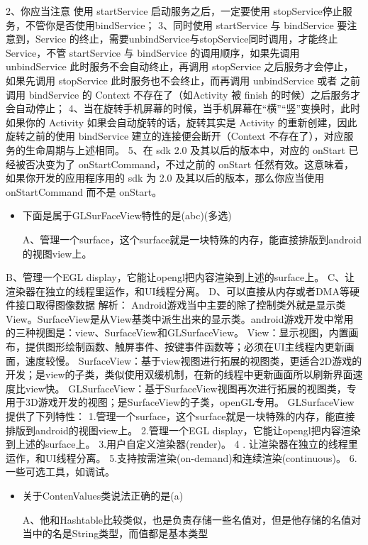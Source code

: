 \documentclass[9pt, b5paper]{article}
\begin{document}
2、你应当注意 使用 startService 启动服务之后，一定要使用 stopService停止服务，不管你是否使用bindService；
3、同时使用 startService 与 bindService 要注意到，Service 的终止，需要unbindService与stopService同时调用，才能终止 Service，不管 startService 与 bindService 的调用顺序，如果先调用 unbindService 此时服务不会自动终止，再调用 stopService 之后服务才会停止，如果先调用 stopService 此时服务也不会终止，而再调用 unbindService 或者 之前调用 bindService 的 Context 不存在了（如Activity 被 finish 的时候）之后服务才会自动停止；
4、当在旋转手机屏幕的时候，当手机屏幕在“横”“竖”变换时，此时如果你的 Activity 如果会自动旋转的话，旋转其实是 Activity 的重新创建，因此旋转之前的使用 bindService 建立的连接便会断开（Context 不存在了），对应服务的生命周期与上述相同。
5、在 sdk 2.0 及其以后的版本中，对应的 onStart 已经被否决变为了 onStartCommand，不过之前的 onStart 任然有效。这意味着，如果你开发的应用程序用的 sdk 为 2.0 及其以后的版本，那么你应当使用 onStartCommand 而不是 onStart。
\begin{itemize}
\item 下面是属于GLSurFaceView特性的是(abc)(多选)

A、管理一个surface，这个surface就是一块特殊的内存，能直接排版到android的视图view上。
\end{itemize}
B、管理一个EGL display，它能让opengl把内容渲染到上述的surface上。
C、让渲染器在独立的线程里运作，和UI线程分离。
D、可以直接从内存或者DMA等硬件接口取得图像数据
    解析：
    Android游戏当中主要的除了控制类外就是显示类View。SurfaceView是从View基类中派生出来的显示类。android游戏开发中常用的三种视图是：view、SurfaceView和GLSurfaceView。
View：显示视图，内置画布，提供图形绘制函数、触屏事件、按键事件函数等；必须在UI主线程内更新画面，速度较慢。
SurfaceView：基于view视图进行拓展的视图类，更适合2D游戏的开发；是view的子类，类似使用双缓机制，在新的线程中更新画面所以刷新界面速度比view快。
GLSurfaceView：基于SurfaceView视图再次进行拓展的视图类，专用于3D游戏开发的视图；是SurfaceView的子类，openGL专用。
 GLSurfaceView提供了下列特性：
                1.管理一个surface，这个surface就是一块特殊的内存，能直接排版到android的视图view上。
                2.管理一个EGL display，它能让opengl把内容渲染到上述的surface上。
                3.用户自定义渲染器(render)。
                4 . 让渲染器在独立的线程里运作，和UI线程分离。
                5.支持按需渲染(on-demand)和连续渲染(continuous)。
                6.一些可选工具，如调试。
\begin{itemize}
\item 关于ContenValues类说法正确的是(a)

A、他和Hashtable比较类似，也是负责存储一些名值对，但是他存储的名值对当中的名是String类型，而值都是基本类型
\end{itemize}
\end{document}
